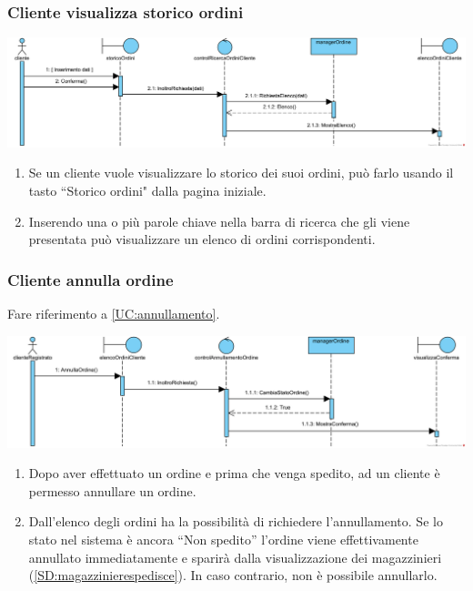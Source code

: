 \documentclass[12pt]{article}
\begin{document}
\subsubsection{Cliente visualizza storico ordini}
\label{SD:storicoordini}
\begin{center}
\includegraphics[width=\textwidth]{SequenceDiagram/ClienteOrdiniRicerca}
\end{center}

\begin{enumerate}
\item Se un cliente vuole visualizzare lo storico dei suoi ordini, può farlo usando il tasto ``Storico ordini" dalla pagina iniziale.
\item Inserendo una o più parole chiave nella barra di ricerca che gli viene presentata può visualizzare un elenco di ordini corrispondenti.
\end{enumerate}

\newpage

\subsubsection{Cliente annulla ordine}
\label{SD:annull}

Fare riferimento a \ref{UC:annullamento}. \\

\begin{center}
\includegraphics[width=\textwidth]{SequenceDiagram/ClienteOrdineAnnulla}
\end{center}

\begin{enumerate}
\item Dopo aver effettuato un ordine e prima che venga spedito, ad un cliente è permesso annullare un ordine.
\item Dall'elenco degli ordini ha la possibilità di richiedere l'annullamento. Se lo stato nel sistema è ancora ``Non spedito'' l'ordine viene effettivamente annullato immediatamente e sparirà dalla visualizzazione dei magazzinieri (\ref{SD:magazzinierespedisce}). In caso contrario, non è possibile annullarlo.
\end{enumerate}
\end{document}
